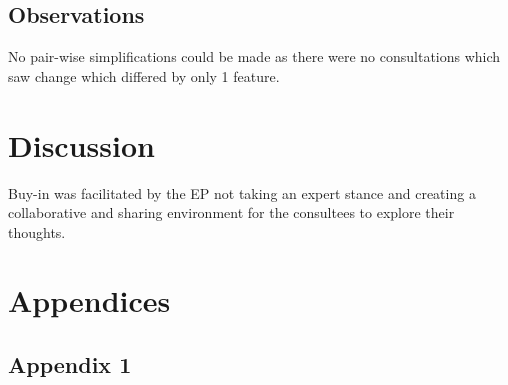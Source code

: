 \documentclass[
]{article}
\begin{document}
\hypertarget{observations}{%
\subsection{Observations}\label{observations}}

No pair-wise simplifications could be made as there were no
consultations which saw change which differed by only 1 feature.

\hypertarget{discussion}{%
\section{Discussion}\label{discussion}}

Buy-in was facilitated by the EP not taking an expert stance and
creating a collaborative and sharing environment for the consultees to
explore their thoughts.

\hypertarget{appendices}{%
\section{Appendices}\label{appendices}}

\hypertarget{appendix-1}{%
\subsection{Appendix 1}\label{appendix-1}}
\end{document}
